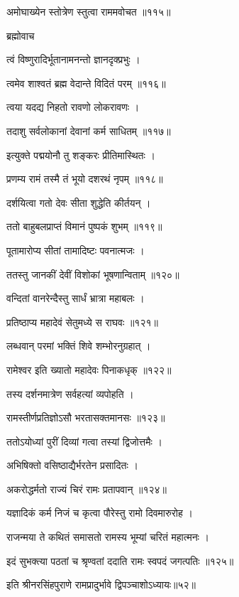 अमोघाख्येन स्तोत्रेण स्तुत्वा राममवोचत ॥११५॥

ब्रह्मोवाच

त्वं विष्णुरादिर्भूतानामनन्तो ज्ञानदृक्प्रभुः ।

त्वमेव शाश्वतं ब्रह्म वेदान्ते विदितं परम् ॥११६॥

त्वया यदद्य निहतो रावणो लोकरावणः ।

तदाशु सर्वलोकानां देवानां कर्म साधितम् ॥११७॥

इत्युक्ते पद्मयोनौ तु शङ्करः प्रीतिमास्थितः ।

प्रणम्य रामं तस्मै तं भूयो दशरथं नृपम् ॥११८॥

दर्शयित्वा गतो देवः सीता शुद्धेति कीर्तयन् ।

ततो बाहुबलप्राप्तं विमानं पुष्पकं शुभम् ॥११९॥

पूतामारोप्य सीतां तामादिष्टः पवनात्मजः ।

ततस्तु जानकीं देवीं विशोकां भूषणान्विताम् ॥१२०॥

वन्दितां वानरेन्दैस्तु सार्धं भ्रात्रा महाबलः ।

प्रतिष्ठाप्य महादेवं सेतुमध्ये स राघवः ॥१२१॥

लब्धवान् परमां भक्तिं शिवे शम्भोरनुग्रहात् ।

रामेश्वर इति ख्यातो महादेवः पिनाकधृक् ॥१२२॥

तस्य दर्शनमात्रेण सर्वहत्यां व्यपोहति ।

रामस्तीर्णप्रतिज्ञोऽसौ भरतासक्तमानसः ॥१२३॥

ततोऽयोध्यां पुरीं दिव्यां गत्वा तस्यां द्विजोत्तमैः ।

अभिषिक्तो वसिष्ठाद्यैर्भरतेन प्रसादितः ।

अकरोद्धर्मतो राज्यं चिरं रामः प्रतापवान् ॥१२४॥

यज्ञादिकं कर्म निजं च कृत्वा पौरेस्तु रामो दिवमारुरोह ।

राजन्मया ते कथितं समासतो रामस्य भूम्यां चरितं महात्मनः ।

इदं सुभक्त्या पठतां च श्रृण्वतां ददाति रामः स्वपदं जगत्पतिः ॥१२५॥

इति श्रीनरसिंहपुराणे रामप्रादुर्भावे द्विपञ्चाशोऽध्यायः॥५२॥

\closesection